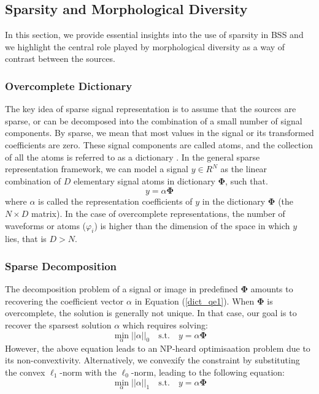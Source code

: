 \subsection{Sparsity and Morphological Diversity}
In this section, we provide essential insights into the use of sparsity in BSS and we highlight the central role played by morphological diversity as a way of contrast between the sources.

\subsubsection{Overcomplete Dictionary}
The key idea of sparse signal representation is to assume
that the sources are sparse, or can be decomposed into the
combination of a small number of signal components. By
sparse, we mean that most values in the signal or its transformed coefficients are zero. These signal components are called atoms, and the collection of all the atoms is referred to as a dictionary \cite{Mallat_Zhang1993}. In the general sparse representation framework, we can model a signal $y \in R^N$ as the linear combination of $D$ elementary signal atoms in dictionary $\mathbf{\Phi}$, such that.
\begin{equation}
    y = \alpha \mathbf{\Phi}
    \label{dict_qe1}
\end{equation}
where $\alpha$ is called the representation coefficients of $y$ in the dictionary $\mathbf{\Phi}$
(the $N \times D$ matrix). 
In the case of overcomplete representations, the number of waveforms or atoms ($\varphi_i$) is higher than the dimension of the space in which $y$ lies, that is $D > N$. 

\subsubsection{Sparse Decomposition}
\label{BSS_sparse_decomp}
The decomposition problem of a signal or image in predefined $\mathbf{\Phi}$ amounts to recovering the coefficient vector $\alpha$ in Equation (\ref{dict_qe1}). When $\mathbf{\Phi}$ is overcomplete, the solution is generally not unique. In that case, our goal is to recover the sparsest solution $\alpha$ which requires solving:
\begin{equation}
    \min_{\alpha}||\alpha||_0 \quad \text{s.t.} \quad y = \alpha \mathbf{\Phi}
\end{equation}
However, the above equation leads to an NP-heard optimisaation problem due to its non-convextivity. Alternatively, we convexify the constraint by substituting the convex $\ell_1$-norm with the $\ell_0$-norm, leading to the following equation:
\begin{equation}
    \min_{\alpha} ||\alpha||_1 \quad \text{s.t.} \quad y = \alpha \mathbf{\Phi}
    \label{l1_sparse}
\end{equation}

